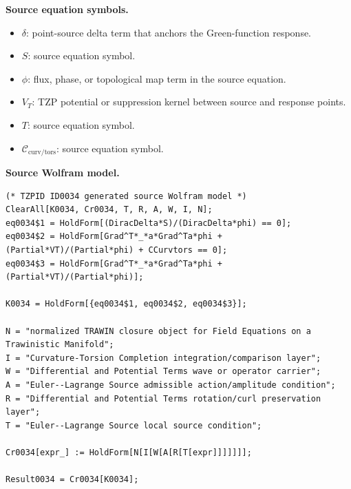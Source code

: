 \begin{minipage}[t]{0.49\linewidth}
\begingroup
\small
\raggedright
\textbf{Source equation symbols.}\par
\begin{itemize}[leftmargin=1.35em,itemsep=1pt,topsep=1pt,parsep=0pt]
    \item $\delta$: point-source delta term that anchors the Green-function response.
    \item $S$: source equation symbol.
    \item $\phi$: flux, phase, or topological map term in the source equation.
    \item $V_{T}$: TZP potential or suppression kernel between source and response points.
    \item $T$: source equation symbol.
    \item $\mathcal{C}_{\mathrm{curv/tors}}$: source equation symbol.
\end{itemize}
\endgroup
\end{minipage}\hfill
\begin{minipage}[t]{0.47\linewidth}
\begingroup
\scriptsize
\raggedright
\textbf{Source Wolfram model.}\par
\begin{Verbatim}[fontsize=\tiny,breaklines=true,breakanywhere=true]
(* TZPID ID0034 generated source Wolfram model *)
ClearAll[K0034, Cr0034, T, R, A, W, I, N];
eq0034$1 = HoldForm[(DiracDelta*S)/(DiracDelta*phi) == 0];
eq0034$2 = HoldForm[Grad^T*_*a*Grad^Ta*phi + (Partial*VT)/(Partial*phi) + CCurvtors == 0];
eq0034$3 = HoldForm[Grad^T*_*a*Grad^Ta*phi + (Partial*VT)/(Partial*phi)];

K0034 = HoldForm[{eq0034$1, eq0034$2, eq0034$3}];

N = "normalized TRAWIN closure object for Field Equations on a Trawinistic Manifold";
I = "Curvature-Torsion Completion integration/comparison layer";
W = "Differential and Potential Terms wave or operator carrier";
A = "Euler--Lagrange Source admissible action/amplitude condition";
R = "Differential and Potential Terms rotation/curl preservation layer";
T = "Euler--Lagrange Source local source condition";

Cr0034[expr_] := HoldForm[N[I[W[A[R[T[expr]]]]]]];

Result0034 = Cr0034[K0034];
\end{Verbatim}
\endgroup
\end{minipage}

